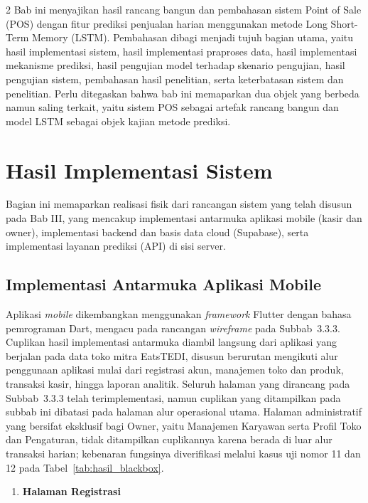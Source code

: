 \documentclass[12pt, a4paper, onecolumn, oneside]{report}
\begin{document}
\begin{spacing}{2}
Bab ini menyajikan hasil rancang bangun dan pembahasan sistem Point of Sale (POS) dengan fitur prediksi penjualan harian menggunakan metode Long Short-Term Memory (LSTM). Pembahasan dibagi menjadi tujuh bagian utama, yaitu hasil implementasi sistem, hasil implementasi praproses data, hasil implementasi mekanisme prediksi, hasil pengujian model terhadap skenario pengujian, hasil pengujian sistem, pembahasan hasil penelitian, serta keterbatasan sistem dan penelitian. Perlu ditegaskan bahwa bab ini memaparkan dua objek yang berbeda namun saling terkait, yaitu sistem POS sebagai artefak rancang bangun dan model LSTM sebagai objek kajian metode prediksi.

\section{Hasil Implementasi Sistem}

Bagian ini memaparkan realisasi fisik dari rancangan sistem yang telah disusun pada Bab III, yang mencakup implementasi antarmuka aplikasi mobile (kasir dan owner), implementasi backend dan basis data cloud (Supabase), serta implementasi layanan prediksi (API) di sisi server.

\subsection{Implementasi Antarmuka Aplikasi Mobile}

Aplikasi \textit{mobile} dikembangkan menggunakan \textit{framework} Flutter dengan bahasa pemrograman Dart, mengacu pada rancangan \textit{wireframe} pada Subbab~3.3.3. Cuplikan hasil implementasi antarmuka diambil langsung dari aplikasi yang berjalan pada data toko mitra EatsTEDI, disusun berurutan mengikuti alur penggunaan aplikasi mulai dari registrasi akun, manajemen toko dan produk, transaksi kasir, hingga laporan analitik. Seluruh halaman yang dirancang pada Subbab~3.3.3 telah terimplementasi, namun cuplikan yang ditampilkan pada subbab ini dibatasi pada halaman alur operasional utama. Halaman administratif yang bersifat eksklusif bagi Owner, yaitu Manajemen Karyawan serta Profil Toko dan Pengaturan, tidak ditampilkan cuplikannya karena berada di luar alur transaksi harian; kebenaran fungsinya diverifikasi melalui kasus uji nomor 11 dan 12 pada Tabel~\ref{tab:hasil_blackbox}.

\begin{enumerate}
    \item \textbf{Halaman Registrasi}


\end{enumerate}
\end{spacing}
\end{document}
